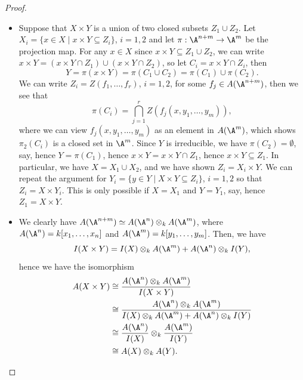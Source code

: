 \documentclass[a4paper]{article}
\begin{document}
\begin{enumerate} [label=\textbf{\arabic*.}, leftmargin=-0.05em]
\begin{proof} $ $ \vspace{0pt}
    \begin{itemize} [leftmargin=0cm]
        \item[(a)] Suppose that $X \times Y$ is a union of two closed subsets $Z_1 \cup Z_2$.
        Let $X_i = \{ x \in X \mid x \times Y \subseteq Z_i \}$, $i = 1, 2$ and let $\pi : \A^{n + m} \to \A^m$ be the projection map.
        For any $x \in X$ since $x \times Y \subseteq Z_1 \cup Z_2$, we can write $x \times Y = (x \times Y \cap Z_1) \cup (x \times Y \cap Z_2)$, so let $C_i = x \times Y \cap Z_i$, then
        \begin{equation*}
            Y = \pi(x \times Y) = \pi(C_1 \cup C_2) = \pi(C_1) \cup \pi(C_2).
        \end{equation*}
        We can write $Z_i = Z(f_1, \dots, f_r)$, $i = 1, 2$, for some $f_j \in A(\A^{n + m})$, then we see that
        \begin{equation*}
            \pi(C_i) = \bigcap_{j = 1}^r Z(f_j(x, y_1, \dots, y_m)),
        \end{equation*}
        where we can view $f_j(x, y_1, \dots, y_m)$ as an element in $A(\A^m)$, which shows $\pi_2(C_i)$ is a closed set in $\A^m$.
        Since $Y$ is irreducible, we have $\pi(C_2) = \emptyset$, say, hence $Y = \pi(C_1)$, hence $x \times Y = x \times Y \cap Z_1$, hence $x \times Y \subseteq Z_1$.
        In particular, we have $X = X_1 \cup X_2$, and we have shown $Z_i = X_i \times Y$.
        We can repeat the argument for $Y_i = \{y \in Y \mid X \times Y \subseteq Z_i\}$, $i = 1, 2$ so that $Z_i = X \times Y_i$.
        This is only possible if $X = X_1$ and $Y = Y_1$, say, hence $Z_1 = X \times Y$.
        
        \item[(b)] We clearly have $A(\A^{n + m}) \simeq A(\A^n) \otimes_k A(\A^m)$, where $A(\A^n) = k[x_1, \dots, x_n]$ and $A(\A^m) = k[y_1, \dots, y_m]$. Then, we have
        \begin{equation*}
            I(X \times Y) = I(X) \otimes_k A(\A^m) + A(\A^n) \otimes_k I(Y),
        \end{equation*}
        hence we have the isomorphism
        \begin{align*}
           A(X \times Y) & \cong \frac{A(\A^n) \otimes_k A(\A^m)}{I(X \times Y)} \\
           & \cong \frac{A(\A^n) \otimes_k A(\A^m)}{ I(X) \otimes_k A(\A^m) + A(\A^n) \otimes_k I(Y)} \\
           & \cong \frac{A(\A^n)}{I(X)} \otimes_k \frac{A(\A^m)}{I(Y)} \\
           & \cong A(X) \otimes_k A(Y).
        \end{align*}


\end{itemize}
\end{proof}
\end{enumerate}
\end{document}
